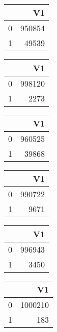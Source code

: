 \bigskip\bigskip
\centering
\begin{tabular}{rr}
  \hline
 & V1 \\ 
  \hline
0 & 950854 \\ 
  1 & 49539 \\ 
   \hline
\end{tabular}

\bigskip\bigskip
\centering
\begin{tabular}{rr}
  \hline
 & V1 \\ 
  \hline
0 & 998120 \\ 
  1 & 2273 \\ 
   \hline
\end{tabular}

\bigskip\bigskip
\centering
\begin{tabular}{rr}
  \hline
 & V1 \\ 
  \hline
0 & 960525 \\ 
  1 & 39868 \\ 
   \hline
\end{tabular}

\bigskip\bigskip
\centering
\begin{tabular}{rr}
  \hline
 & V1 \\ 
  \hline
0 & 990722 \\ 
  1 & 9671 \\ 
   \hline
\end{tabular}

\bigskip\bigskip
\centering
\begin{tabular}{rr}
  \hline
 & V1 \\ 
  \hline
0 & 996943 \\ 
  1 & 3450 \\ 
   \hline
\end{tabular}

\bigskip\bigskip
\centering
\begin{tabular}{rr}
  \hline
 & V1 \\ 
  \hline
0 & 1000210 \\ 
  1 & 183 \\ 
   \hline
\end{tabular}

